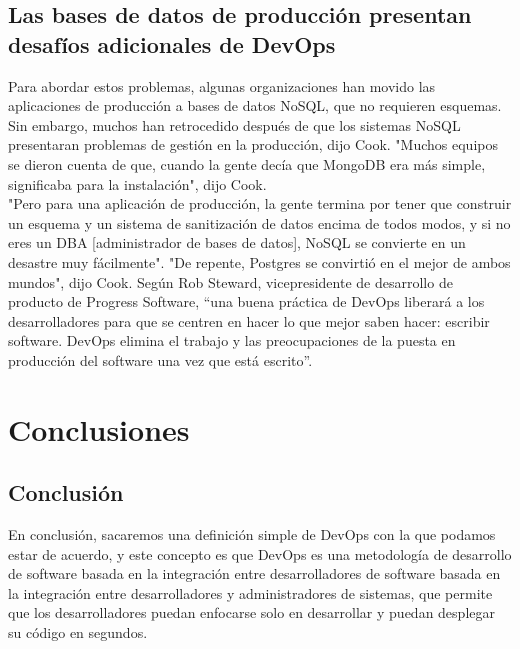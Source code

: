 \documentclass[preprint,12pt]{elsarticle}
\begin{document}
\subsection{Las bases de datos de producción presentan desafíos adicionales de DevOps}
Para abordar estos problemas, algunas organizaciones han movido las aplicaciones de producción a bases de datos NoSQL, que no requieren esquemas. 
Sin embargo, muchos han retrocedido después de que los sistemas NoSQL presentaran problemas de gestión en la producción, dijo Cook.
"Muchos equipos se dieron cuenta de que, cuando la gente decía que MongoDB era más simple, significaba para la instalación", dijo Cook.
\\
 "Pero para una aplicación de producción, la gente termina por tener que construir un esquema y un sistema de sanitización de datos encima de todos modos, y si no eres un DBA [administrador de bases de datos], NoSQL se convierte en un desastre muy fácilmente".
"De repente, Postgres se convirtió en el mejor de ambos mundos", dijo Cook.
Según Rob Steward, vicepresidente de desarrollo de producto de Progress Software, “una buena práctica de DevOps liberará a los desarrolladores para que se centren en hacer lo que mejor saben hacer: escribir software. DevOps elimina el trabajo y las preocupaciones de la puesta en producción del software una vez que está escrito”.






\section{Conclusiones}
\subsection{Conclusión }	
En conclusión, sacaremos una definición simple de DevOps con la que podamos estar de acuerdo, y este concepto es que DevOps es una metodología de desarrollo de software basada en la integración entre desarrolladores de software basada en la integración entre desarrolladores y administradores de sistemas, que permite que los desarrolladores puedan enfocarse solo en desarrollar y puedan desplegar su código en segundos.
\end{document}
